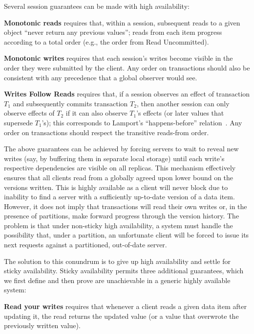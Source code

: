 Several session guarantees can be made with high availability:

\vspace{.5em}\noindent\textbf{{Monotonic reads}} requires that, within
a session, subsequent reads to a given object ``never return any
previous values''; reads from each item progress according to a total
order (e.g., the order from Read Uncommitted).

\vspace{.5em}\noindent\textbf{{Monotonic writes}} requires that each
session's writes become visible in the order they were submitted by
the client. Any order on transactions should also be consistent with
any precedence that a global observer would see.

\vspace{.5em}\noindent\textbf{{Writes Follow Reads}} requires that, if
a session observes an effect of transaction $T_1$ and subsequently
commits transaction $T_2$, then another session can only observe
effects of $T_2$ if it can also observe $T_1$'s effects (or later
values that supersede $T_1$'s); this corresponds to Lamport's
``happens-before'' relation~\cite{lamportclocks}.  Any order on
transactions should respect the transitive reads-from
order.\vspace{.5em}

The above guarantees can be achieved by forcing servers to wait to
reveal new writes (say, by buffering them in separate local storage)
until each write's respective dependencies are visible on all
replicas. This mechanism effectively ensures that all clients read
from a globally agreed upon lower bound on the versions written. This
is highly available as a client will never block due to inability to
find a server with a sufficiently up-to-date version of a data
item. However, it does not imply that transactions will read their own
writes or, in the presence of partitions, make forward progress
through the version history. The problem is that under non-sticky high
availability, a system must handle the possibility that, under a
partition, an unfortunate client will be forced to issue its next
requests against a partitioned, out-of-date server.

The solution to this conundrum is to give up high availability and
settle for sticky availability. Sticky availability permits three
additional guarantees, which we first define and then prove are
unachievable in a generic highly available system:

\vspace{.5em}\noindent\textbf{{Read your writes}} requires that
whenever a client reads a given data item after updating it, the read
returns the updated value (or a value that overwrote the previously
written value).

